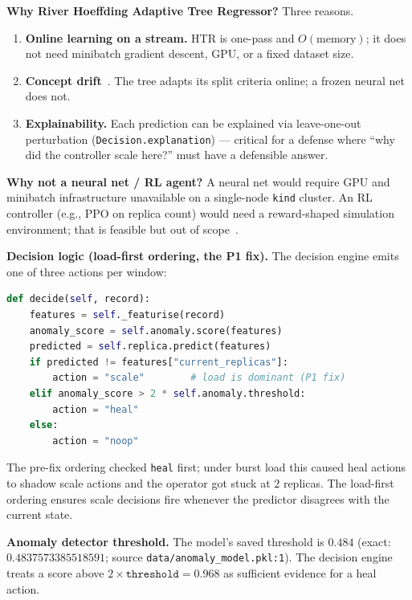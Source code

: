 \documentclass[conference,10pt]{IEEEtran}
\begin{document}
\textbf{Why River Hoeffding Adaptive Tree Regressor?} Three reasons.
\begin{enumerate}
    \item \textbf{Online learning on a stream.} HTR is one-pass and
          $O(\text{memory})$; it does not need minibatch gradient
          descent, GPU, or a fixed dataset size.
    \item \textbf{Concept drift}~\cite{webb_concept_drift_2016}. The tree adapts
          its split criteria online; a frozen neural net does not.
    \item \textbf{Explainability.} Each prediction can be explained
          via leave-one-out perturbation
          (\texttt{Decision.explanation}) --- critical for a defense
          where ``why did the controller scale here?'' must have a
          defensible answer.
\end{enumerate}

\textbf{Why not a neural net / RL agent?} A neural net would require
GPU and minibatch infrastructure unavailable on a single-node
\texttt{kind} cluster. An RL controller (e.g., PPO on replica count)
would need a reward-shaped simulation environment; that is feasible
but out of scope~\cite{shielding_safe_rl}.

\textbf{Decision logic (load-first ordering, the P1 fix).} The decision
engine emits one of three actions per window:
\begin{lstlisting}[language=Python,caption={Load-first ordering (locked citation: \texttt{src/decision/decision\_engine.py:262-268}).}]
def decide(self, record):
    features = self._featurise(record)
    anomaly_score = self.anomaly.score(features)
    predicted = self.replica.predict(features)
    if predicted != features["current_replicas"]:
        action = "scale"        # load is dominant (P1 fix)
    elif anomaly_score > 2 * self.anomaly.threshold:
        action = "heal"
    else:
        action = "noop"
\end{lstlisting}
The pre-fix ordering checked \texttt{heal} first; under burst load this
caused heal actions to shadow scale actions and the operator got
stuck at $2$ replicas. The load-first ordering ensures scale
decisions fire whenever the predictor disagrees with the current state.

\textbf{Anomaly detector threshold.} The model's saved threshold is
$0.484$ (exact: $0.4837573385518591$;
source \texttt{data/anomaly\_model.pkl:1}). The decision engine
treats a score above $2 \times \texttt{threshold} = 0.968$ as
sufficient evidence for a heal action.
\end{document}
